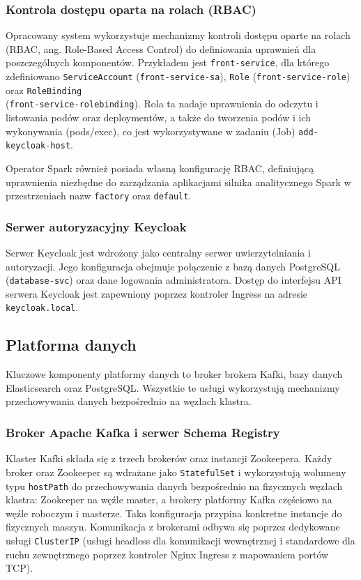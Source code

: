 \subsubsection{Kontrola dostępu oparta na rolach (RBAC)}
\label{subsubsec:RBAC}
Opracowany system wykorzystuje mechanizmy kontroli dostępu oparte na rolach (RBAC, ang. Role-Based Access Control) do definiowania uprawnień dla poszczególnych komponentów. Przykładem jest \texttt{front-service}, dla którego zdefiniowano \texttt{ServiceAccount} (\texttt{front-service-sa}), \texttt{Role} (\texttt{front-service-role}) oraz \texttt{RoleBinding} \\ (\texttt{front-service-rolebinding}). Rola ta nadaje uprawnienia do odczytu i listowania podów oraz deploymentów, a także do tworzenia podów i ich wykonywania (pods/exec), co jest wykorzystywane w zadaniu (Job) \texttt{add-keycloak-host}.

Operator Spark również posiada własną konfigurację RBAC, definiującą uprawnienia niezbędne do zarządzania aplikacjami silnika analitycznego Spark w przestrzeniach nazw \texttt{factory} oraz \texttt{default}.

\subsubsection{Serwer autoryzacyjny Keycloak}
Serwer Keycloak jest wdrożony jako centralny serwer uwierzytelniania i autoryzacji. Jego konfiguracja obejmuje połączenie z bazą danych PostgreSQL (\texttt{database-svc}) oraz dane logowania administratora. Dostęp do interfejsu API serwera Keycloak jest zapewniony poprzez kontroler Ingress na adresie \texttt{keycloak.local}.

\subsection{Platforma danych}

Kluczowe komponenty platformy danych to broker brokera Kafki, bazy danych Elasticsearch oraz PostgreSQL. Wszystkie te usługi wykorzystują mechanizmy przechowywania danych bezpośrednio na węzłach klastra.

\subsubsection{Broker Apache Kafka i serwer Schema Registry}
Klaster Kafki składa się z trzech brokerów oraz instancji Zookeepera. Każdy broker oraz Zookeeper są wdrażane jako \texttt{StatefulSet} i wykorzystują wolumeny typu \texttt{hostPath} do przechowywania danych bezpośrednio na fizycznych węzłach klastra: Zookeeper na węźle master, a brokery platformy Kafka częściowo na węźle roboczym i masterze. Taka konfiguracja przypina konkretne instancje do fizycznych maszyn. Komunikacja z brokerami odbywa się poprzez dedykowane usługi \texttt{ClusterIP} (usługi headless dla komunikacji wewnętrznej i standardowe dla ruchu zewnętrznego poprzez kontroler Nginx Ingress z mapowaniem portów TCP).


